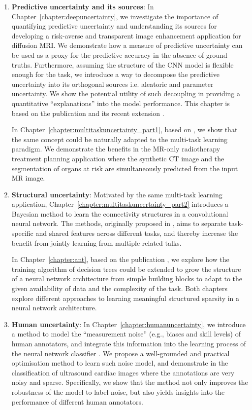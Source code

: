 \begin{enumerate}[label=(\alph*)]
	\item \textbf{Predictive uncertainty and its sources}: In Chapter~\ref{chapter:deepuncertainty}, we investigate the importance of quantifying predictive uncertainty and understanding its sources for developing a risk-averse and transparent image enhancement application for diffusion MRI. We demonstrate how a measure of predictive uncertainty can be used as a proxy for the predictive accuracy in the absence of ground-truths. Furthermore, assuming the structure of the CNN model is flexible enough for the task, we introduce a way to decompose the predictive uncertainty into its orthogonal sources i.e. aleatoric and parameter uncertainty. We show the potential utility of such decoupling in providing a quantitative ``explanations'' into the model performance. This chapter is based on the publication  \cite{tanno2017bayesian} and its recent extension \cite{tannonimg2019}. 
	
	In Chapter~\ref{chapter:multitaskuncertainty_part1}, based on \cite{bragman2018multi}, we show that the same concept could be naturally adapted to the multi-task learning paradigm. We demonstrate the benefits in the MR-only radiotherapy treatment planning application where the synthetic CT image and the segmentation of organs at risk are simultaneously predicted from the input MR image. 
	
	\item \textbf{Structural uncertainty}: 	Motivated by the same multi-task learning application, Chapter~\ref{chapter:multitaskuncertainty_part2} introduces a Bayesian method to learn the connectivity structures in a convolutional neural network. The methods, originally proposed in \cite{sfg2019},  aims to separate task-specific and shared features across different tasks, and thereby increase the benefit from jointly learning from multiple related talks. 
	
	In Chapter~\ref{chapter:ant}, based on the publication \cite{AdaptiveNeuralTrees19}, we explore how the training algorithm of decision trees could be extended to grow the structure of a neural network architecture from simple building blocks to adapt to the given availability of data and the complexity of the task. Both chapters explore different approaches to learning meaningful structured sparsity in a neural network architecture. 
	
	\item \textbf{Human uncertainty}: In Chapter~\ref{chapter:humanuncertainty}, we introduce a method to model the ``measurement noise'' (e.g., biases and skill levels) of human annotators, and integrate this information into the learning process of the neural network classifier \cite{tanno2019learning}. We propose a well-grounded and practical optimisation method to learn such noise model, and demonstrate in the classification of ultrasound cardiac images where the annotations are very noisy and sparse. Specifically, we show that the method not only improves the robustness of the model to label noise, but also yields insights into the performance of different human annotators.
	
\end{enumerate}

